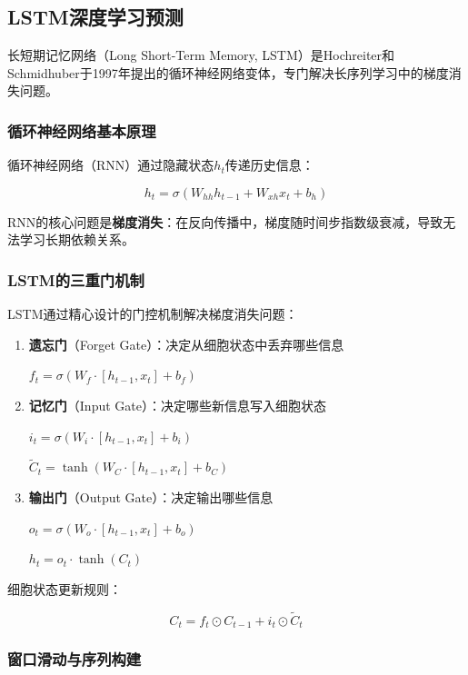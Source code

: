 \subsection{LSTM深度学习预测}

长短期记忆网络（Long Short-Term Memory, LSTM）是Hochreiter和Schmidhuber于1997年提出的循环神经网络变体，专门解决长序列学习中的梯度消失问题。

\subsubsection{循环神经网络基本原理}

循环神经网络（RNN）通过隐藏状态$h_t$传递历史信息：

\[
h_t = \sigma(W_{hh}h_{t-1} + W_{xh}x_t + b_h)
\]

RNN的核心问题是\textbf{梯度消失}：在反向传播中，梯度随时间步指数级衰减，导致无法学习长期依赖关系。

\subsubsection{LSTM的三重门机制}

LSTM通过精心设计的门控机制解决梯度消失问题：

\begin{enumerate}[leftmargin=2em]
  \item \textbf{遗忘门}（Forget Gate）：决定从细胞状态中丢弃哪些信息

  $f_t = \sigma(W_f \cdot [h_{t-1}, x_t] + b_f)$

  \item \textbf{记忆门}（Input Gate）：决定哪些新信息写入细胞状态

  $i_t = \sigma(W_i \cdot [h_{t-1}, x_t] + b_i)$

  $\tilde{C}_t = \tanh(W_C \cdot [h_{t-1}, x_t] + b_C)$

  \item \textbf{输出门}（Output Gate）：决定输出哪些信息

  $o_t = \sigma(W_o \cdot [h_{t-1}, x_t] + b_o)$

  $h_t = o_t \cdot \tanh(C_t)$
\end{enumerate}

细胞状态更新规则：

\[
C_t = f_t \odot C_{t-1} + i_t \odot \tilde{C}_t
\]

\subsubsection{窗口滑动与序列构建}


